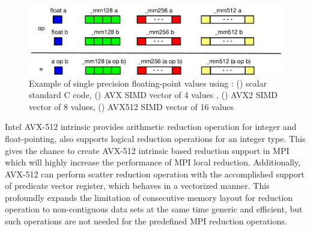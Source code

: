 \documentclass[sigconf]{acmart}
\newcommand{\mpi}[0]{\textsc{MPI}\xspace}
\begin{document}
\begin{figure}[h]
    \centering
    \includegraphics[width=\linewidth]{sse_avx.pdf}
    \caption{Example of single precision floating-point values using : (\colorbox{blue}{}) scalar standard C code, (\colorbox{green}{}) AVX SIMD vector of 4 values , (\colorbox{red}{}) AVX2 SIMD vector of 8 values, (\colorbox{yellow}{}) AVX512 SIMD vector of 16 values}
    \label{fig:sse_avx}
\end{figure}

Intel AVX-512 intrinsic provides arithmetic reduction operation for integer and
float-pointing, also supports logical reduction operations for an integer type.
This gives the chance to create AVX-512 intrinsic based reduction support in \mpi which
will highly increase the performance of \mpi local reduction.
Additionally, AVX-512 can perform scatter reduction operation with the accomplished
support of predicate vector register, which behaves in a vectorized manner. This profoundly
expands the limitation of consecutive memory layout for reduction operation to non-contiguous
data sets at the same time generic and efficient, but such operations
are not needed for the predefined MPI reduction operations.
\end{document}
